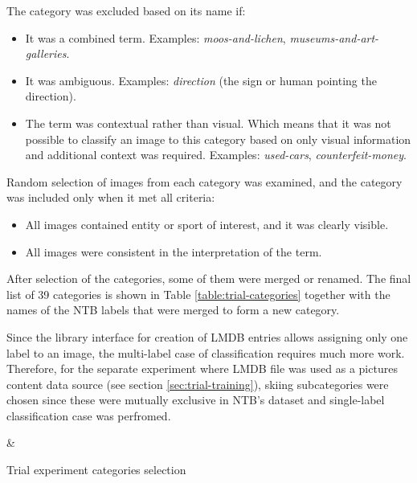     The category was excluded based on its name if:
    \begin{itemize}
        \item It was a combined term. Examples: \textit{moos-and-lichen}, \textit{museums-and-art-galleries}.
        \item It was ambiguous. Examples: \textit{direction} (the sign or human pointing the direction).
        \item The term was contextual rather than visual. Which means that it was not possible to classify an image to this category based on only visual information and additional context was required. Examples: \textit{used-cars}, \textit{counterfeit-money}.
    \end{itemize}
    
    Random selection of images from each category was examined, and the category was included only when it met all criteria:
    \begin{itemize}
        \item All images contained entity or sport of interest, and it was clearly visible.
        \item All images were consistent in the interpretation of the term.
    \end{itemize}
    
    After selection of the categories, some of them were merged or renamed. The final list of 39 categories is shown in Table \ref{table:trial-categories} together with the names of the NTB labels that were merged to form a new category.
    
    Since the library interface for creation of LMDB entries allows assigning only one label to an image, the multi-label case of classification requires much more work. Therefore, for the separate experiment where LMDB \cite{lmdb} file was used as a pictures content data source (see section \ref{sec:trial-training}), skiing subcategories were chosen since these were mutually exclusive in NTB's dataset and single-label classification case was perfromed.
    
    \begin{table}[H]
    \small
    \centering
    {}
    {\category & \ntbcategories}
    
    \caption{Trial experiment categories selection}
    \label{table:trial-categories}
    \end{table}
    
